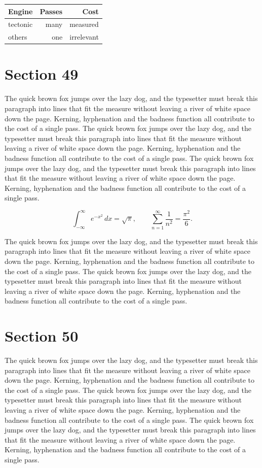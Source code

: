 \documentclass{article}
\begin{document}
\begin{center}
\begin{tabular}{lrr}
\toprule
Engine & Passes & Cost \\
\midrule
tectonic & many & measured \\
others & one & irrelevant \\
\bottomrule
\end{tabular}
\end{center}

\section{Section 49}
The quick brown fox jumps over the lazy dog, and the typesetter must break this paragraph into lines that fit the measure without leaving a river of white space down the page. Kerning, hyphenation and the badness function all contribute to the cost of a single pass. The quick brown fox jumps over the lazy dog, and the typesetter must break this paragraph into lines that fit the measure without leaving a river of white space down the page. Kerning, hyphenation and the badness function all contribute to the cost of a single pass. The quick brown fox jumps over the lazy dog, and the typesetter must break this paragraph into lines that fit the measure without leaving a river of white space down the page. Kerning, hyphenation and the badness function all contribute to the cost of a single pass. 

\begin{equation}
\int_{-\infty}^{\infty} e^{-x^{2}}\,dx = \sqrt{\pi}, \qquad
\sum_{n=1}^{\infty} \frac{1}{n^{2}} = \frac{\pi^{2}}{6}.
\end{equation}

The quick brown fox jumps over the lazy dog, and the typesetter must break this paragraph into lines that fit the measure without leaving a river of white space down the page. Kerning, hyphenation and the badness function all contribute to the cost of a single pass. The quick brown fox jumps over the lazy dog, and the typesetter must break this paragraph into lines that fit the measure without leaving a river of white space down the page. Kerning, hyphenation and the badness function all contribute to the cost of a single pass. 
\section{Section 50}
The quick brown fox jumps over the lazy dog, and the typesetter must break this paragraph into lines that fit the measure without leaving a river of white space down the page. Kerning, hyphenation and the badness function all contribute to the cost of a single pass. The quick brown fox jumps over the lazy dog, and the typesetter must break this paragraph into lines that fit the measure without leaving a river of white space down the page. Kerning, hyphenation and the badness function all contribute to the cost of a single pass. The quick brown fox jumps over the lazy dog, and the typesetter must break this paragraph into lines that fit the measure without leaving a river of white space down the page. Kerning, hyphenation and the badness function all contribute to the cost of a single pass. 
\end{document}
